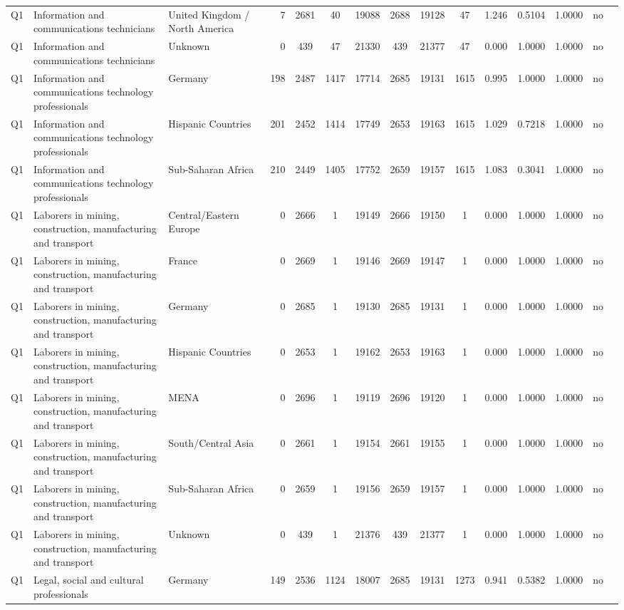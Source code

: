 \begin{longtable}{lllrcccccccccll}
Q1 & Information and communications technicians & United Kingdom / North America & 7 & 2681 & 40 & 19088 & 2688 & 19128 & 47 & 1.246 & 0.5104 & 1.0000 & no \\
Q1 & Information and communications technicians & Unknown & 0 & 439 & 47 & 21330 & 439 & 21377 & 47 & 0.000 & 1.0000 & 1.0000 & no \\
Q1 & Information and communications technology professionals & Germany & 198 & 2487 & 1417 & 17714 & 2685 & 19131 & 1615 & 0.995 & 1.0000 & 1.0000 & no \\
Q1 & Information and communications technology professionals & Hispanic Countries & 201 & 2452 & 1414 & 17749 & 2653 & 19163 & 1615 & 1.029 & 0.7218 & 1.0000 & no \\
Q1 & Information and communications technology professionals & Sub-Saharan Africa & 210 & 2449 & 1405 & 17752 & 2659 & 19157 & 1615 & 1.083 & 0.3041 & 1.0000 & no \\
Q1 & Laborers in mining, construction, manufacturing and transport & Central/Eastern Europe & 0 & 2666 & 1 & 19149 & 2666 & 19150 & 1 & 0.000 & 1.0000 & 1.0000 & no \\
Q1 & Laborers in mining, construction, manufacturing and transport & France & 0 & 2669 & 1 & 19146 & 2669 & 19147 & 1 & 0.000 & 1.0000 & 1.0000 & no \\
Q1 & Laborers in mining, construction, manufacturing and transport & Germany & 0 & 2685 & 1 & 19130 & 2685 & 19131 & 1 & 0.000 & 1.0000 & 1.0000 & no \\
Q1 & Laborers in mining, construction, manufacturing and transport & Hispanic Countries & 0 & 2653 & 1 & 19162 & 2653 & 19163 & 1 & 0.000 & 1.0000 & 1.0000 & no \\
Q1 & Laborers in mining, construction, manufacturing and transport & MENA & 0 & 2696 & 1 & 19119 & 2696 & 19120 & 1 & 0.000 & 1.0000 & 1.0000 & no \\
Q1 & Laborers in mining, construction, manufacturing and transport & South/Central Asia & 0 & 2661 & 1 & 19154 & 2661 & 19155 & 1 & 0.000 & 1.0000 & 1.0000 & no \\
Q1 & Laborers in mining, construction, manufacturing and transport & Sub-Saharan Africa & 0 & 2659 & 1 & 19156 & 2659 & 19157 & 1 & 0.000 & 1.0000 & 1.0000 & no \\
Q1 & Laborers in mining, construction, manufacturing and transport & Unknown & 0 & 439 & 1 & 21376 & 439 & 21377 & 1 & 0.000 & 1.0000 & 1.0000 & no \\
Q1 & Legal, social and cultural professionals & Germany & 149 & 2536 & 1124 & 18007 & 2685 & 19131 & 1273 & 0.941 & 0.5382 & 1.0000 & no \\

\end{longtable}
